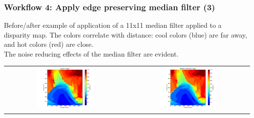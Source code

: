 \documentclass[19pt]{beamer}
\begin{document}
\begin{frame}
\frametitle{Workflow 4: Apply edge preserving median filter (3)}

\vspace*{15pt}
Before/after example of application of a 11x11 median filter applied to a disparity map. The colors correlate with distance: cool colors (blue) are far away, and hot colors (red) are close. \\[10pt]
%
The noise reducing effects of the median filter are evident.

\vspace*{-5pt}
\begin{center}
\begin{tabular}{cc}
\includegraphics[width=0.49\textwidth, trim=60 10 25 10, clip]{images/median1.png} &
\includegraphics[width=0.49\textwidth, trim=60 10 25 10, clip]{images/median2.png}
\end{tabular}
\end{center}

\end{frame}
\end{document}
